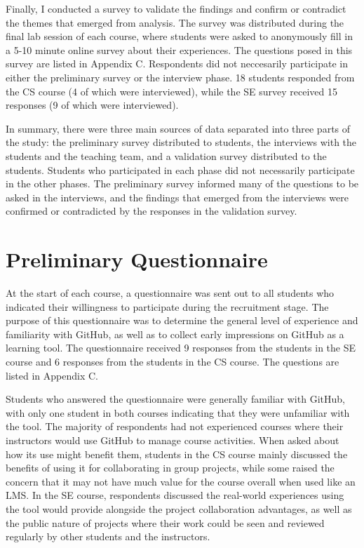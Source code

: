 Finally, I conducted a survey to validate the findings and confirm or contradict the themes that emerged from analysis. The survey was distributed during the final lab session of each course, where students were asked to anonymously fill in a 5-10 minute online survey about their experiences. The questions posed in this survey are listed in Appendix C. Respondents did not neccesarily participate in either the preliminary survey or the interview phase. 18 students responded from the CS course (4 of which were interviewed), while the SE survey received 15 responses (9 of which were interviewed).

In summary, there were three main sources of data separated into three parts of the study: the preliminary survey distributed to students, the interviews with the students and the teaching team, and a validation survey distributed to the students. Students who participated in each phase did not necessarily participate in the other phases. The preliminary survey informed many of the questions to be asked in the interviews, and the findings that emerged from the interviews were confirmed or contradicted by the responses in the validation survey.

\section{Preliminary Questionnaire}
At the start of each course, a questionnaire was sent out to all students who indicated their willingness to participate during the recruitment stage. The purpose of this questionnaire was to determine the general level of experience and familiarity with GitHub, as well as to collect early impressions on GitHub as a learning tool. The questionnaire received 9 responses from the students in the SE course and 6 responses from the students in the CS course. The questions are listed in Appendix C.

Students who answered the questionnaire were generally familiar with GitHub, with only one student in both courses indicating that they were unfamiliar with the tool. The majority of respondents had not experienced courses where their instructors would use GitHub to manage course activities. When asked about how its use might benefit them, students in the CS course mainly discussed the benefits of using it for collaborating in group projects, while some raised the concern that it may not have much value for the course overall when used like an LMS. In the SE course, respondents discussed the real-world experiences using the tool would provide alongside the project collaboration advantages, as well as the public nature of projects where their work could be seen and reviewed regularly by other students and the instructors.

